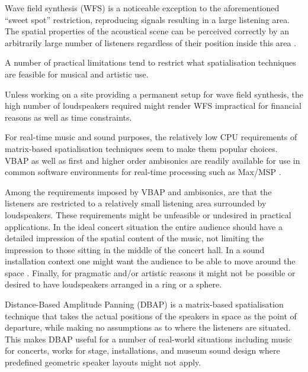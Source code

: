 \documentclass[twoside,10pt]{article}
\begin{document}
Wave field synthesis (WFS) is a noticeable exception to the aforementioned ``sweet spot'' restriction, reproducing signals resulting in a large listening area. The spatial properties of the acoustical scene can be perceived correctly by an arbitrarily large number of listeners regardless of their position inside this area \cite{Spors:2004sound_field_synthesis}.

A number of practical limitations tend to restrict what spatialisation techniques are feasible for musical and artistic use.

Unless working on a site providing a permanent setup for wave field synthesis, the high number of loudspeakers required might render WFS impractical for financial reasons as well as time constraints.

For real-time music and sound purposes, the relatively low CPU requirements of matrix-based spatialisation techniques seem to make them popular choices. 
VBAP as well as first and higher order ambisonics are readily available for use in common software environments for real-time processing such as Max/MSP \cite{Pulkki:2000vbap_max, Schacher:2006ambi_max, Neukom:2008ambipan}.

Among the requirements imposed by VBAP and ambisonics, are that the listeners are restricted to a relatively small listening area surrounded by loudspeakers.  These requirements might be unfeasible or undesired in practical applications.  In the ideal concert situation the entire audience should have a detailed impression of the spatial content of the music, not limiting the impression to those sitting in the middle of the concert hall. In a sound installation context one might want the audience to be able to move around the space \cite{lossius:2008installations}.  Finally, for pragmatic and/or artistic reasons it might not be possible or desired to have loudspeakers arranged in a ring or a sphere.

Distance-Based Amplitude Panning (DBAP) is a matrix-based spatialisation technique that takes the actual positions of the speakers in space as the point of departure, while making no assumptions as to where the listeners are situated. This makes DBAP useful for a number of real-world situations including music for concerts, works for stage, installations, and museum sound design where predefined geometric speaker layouts might not apply.
\end{document}
